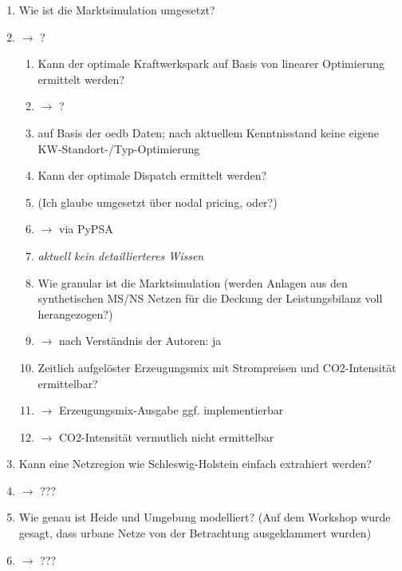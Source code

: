 \documentclass[
a4paper,     %
12pt         %
]{scrartcl}  %
\begin{document}
\begin{enumerate}

%	


	\item Wie ist die Marktsimulation umgesetzt?
	\item[] $\rightarrow$ ?
	\begin{enumerate}
		\item Kann der optimale Kraftwerkspark auf Basis von linearer Optimierung ermittelt werden?
		\item[]$\rightarrow$ ?
		\item[] auf Basis der oedb Daten; nach aktuellem Kenntnisstand keine eigene KW-Standort-/Typ-Optimierung
		
		\item Kann der optimale Dispatch ermittelt werden?
		\item[] (Ich glaube umgesetzt über nodal pricing, oder?)
		\item[]$\rightarrow$ via PyPSA
		\item[] \textit{aktuell kein detaillierteres Wissen}
		
		\item Wie granular ist die Marktsimulation (werden Anlagen aus den synthetischen MS/NS Netzen für die Deckung der Leistungsbilanz voll herangezogen?)
		\item[]$\rightarrow$ nach Verständnis der Autoren: ja
		\item Zeitlich aufgelöster Erzeugungsmix mit Strompreisen und CO2-Intensität ermittelbar?
		\item[] $\rightarrow$ Erzeugungsmix-Ausgabe ggf. implementierbar
		\item[] $\rightarrow$ CO2-Intensität vermutlich nicht ermittelbar
	\end{enumerate}
	
	\item  Kann eine Netzregion wie Schleswig-Holstein einfach extrahiert werden?
	\item[] $\rightarrow$ ??? 
	\item Wie genau ist Heide und Umgebung modelliert? (Auf dem Workshop wurde gesagt, dass urbane Netze von der Betrachtung ausgeklammert wurden)
	\item[] $\rightarrow$ ???
	

\end{enumerate}
\end{document}
